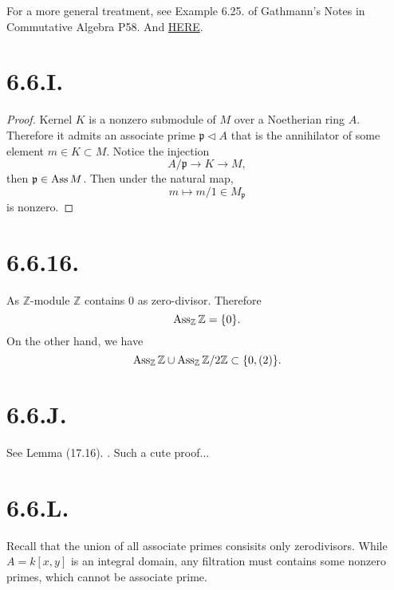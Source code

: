 For a more general treatment, see Example 6.25. of Gathmann's Notes in Commutative Algebra P58. And \href{https://math.stackexchange.com/questions/4852147/what-are-the-localizations-of-mathbbz-n-mathbbz-at-prime-ideals-in-genera/4852148#4852148}{HERE}.

\section{6.6.I.}

\begin{proof}
Kernel $K$ is a nonzero submodule of $M$ over a Noetherian ring $A$. Therefore it admits an associate prime $\mathfrak p\triangleleft A$ that is the annihilator of some element $m\in K\subset M$. Notice the injection
\[A/\mathfrak p\to K\to M,\] then $\mathfrak p\in \operatorname{Ass} M$. Then under the natural map, 
\[m\mapsto m/1 \in M_{\mathfrak p}\] is nonzero.
\end{proof}

\section{6.6.16.}

As $\mathbb Z$-module $\mathbb Z$ contains $0$ as zero-divisor. Therefore 
\[\operatorname{Ass}_{\mathbb Z}\mathbb Z=\{0\}.\]
On the other hand, we have 
\[\operatorname{Ass}_{\mathbb Z}\mathbb Z\cup \operatorname{Ass}_{\mathbb Z}\mathbb Z/2\mathbb Z\subset \{0,(2)\}.\]

\section{6.6.J.}

See Lemma (17.16). \cite{altman2013term}. Such a cute proof...

\section{6.6.L.}

Recall that the union of all associate primes consisits only zerodivisors. While $A=k[x,y]$ is an integral domain, any filtration must contains some nonzero primes, which cannot be associate prime.